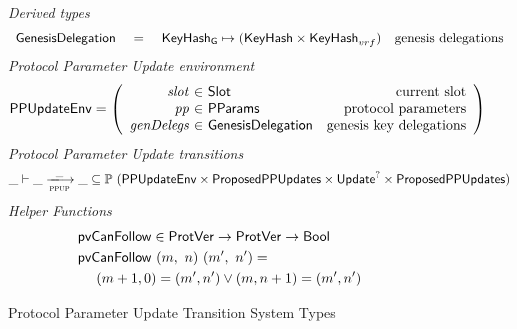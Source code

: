 \begin{figure}[htb]
  \emph{Derived types}
  \begin{equation*}
    \begin{array}{lclr}
      \mathsf{GenesisDelegation}
      & ~=~
      & \mathsf{KeyHash_G}\mapsto(\mathsf{KeyHash}\times\mathsf{KeyHash}_{vrf})
      & \text{genesis delegations} \\
    \end{array}
  \end{equation*}
  \emph{Protocol Parameter Update environment}
  \begin{equation*}
    \PPUpdateEnv =
    \left(
      \begin{array}{r@{~\in~}lr}
        \var{slot} & \Slot & \text{current slot}\\
        \var{pp} & \PParams & \text{protocol parameters}\\
        \var{genDelegs} & \GenesisDelegation
                        & \text{genesis key delegations} \\
      \end{array}
    \right)
  \end{equation*}
  \emph{Protocol Parameter Update transitions}
  \begin{equation*}
    \_ \vdash
    \var{\_} \trans{ppup}{\_} \var{\_}
    \subseteq \powerset (
    \PPUpdateEnv \times \ProposedPPUpdates \times \Update^? \times \ProposedPPUpdates)
  \end{equation*}
  \emph{Helper Functions}
  \begin{align*}
      & \mathsf{pvCanFollow} \in \mathsf{ProtVer} \to \mathsf{ProtVer} \to \mathsf{Bool}\\
      & \mathsf{pvCanFollow}~(m,~n)~(m',~n') = \\
      & ~~~~(m + 1, 0) = (m', n') \lor (m, n + 1) = (m', n')
  \end{align*}
  \caption{Protocol Parameter Update Transition System Types}
  \label{fig:ts-types:pp-update}
\end{figure}

